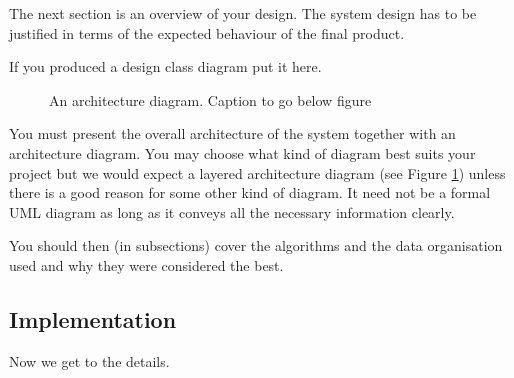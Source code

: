 \documentclass[11pt,a4paper]{article}
\begin{document}
The next section is an overview of your design. The system design has
to be justified in terms of the expected behaviour of the final
product. 

If you produced a design class diagram put it here.

\begin{figure}[h!]
  \caption{An architecture diagram. Caption to go below figure}
  \label{fig:architecture}
\end{figure}

You must present the overall architecture of the system together with
an architecture diagram. You may choose what kind of diagram best
suits your project but we would expect a layered architecture diagram
(see Figure \ref{fig:architecture}) unless there is a good reason for
some other kind of diagram. It need not be a formal UML diagram as
long as it conveys all the necessary information clearly.

You should then (in subsections) cover the algorithms and the data
organisation used and why they were considered the best. 

\subsection{Implementation}

Now we get to the details. 
\end{document}
